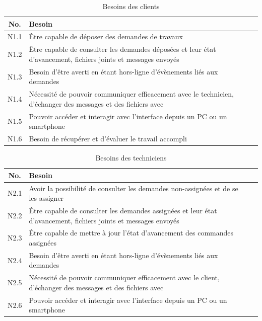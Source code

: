 \documentclass[
    iai, %
    eai, %
]{heig-tb}
\begin{document}
\begin{table}[h]
  \begin{center}
    \caption{Besoins des clients}
    \begin{tabularx}{\textwidth}{cXc}
      No.  & Besoin                                                                                                         \\ \toprule
      N1.1 & Être capable de déposer des demandes de travaux                                                                \\ \midrule
      N1.2 & Être capable de consulter les demandes déposées et leur état d'avancement, fichiers joints et messages envoyés \\ \midrule
      N1.3 & Besoin d'être averti en étant hors-ligne d'évènements liés aux demandes                                        \\ \midrule
      N1.4 & Nécessité de pouvoir communiquer efficacement avec le technicien, d'échanger des messages et des fichiers avec \\ \midrule
      N1.5 & Pouvoir accéder et interagir avec l'interface depuis un PC ou un smartphone                                    \\ \midrule
      N1.6 & Besoin de récupérer et d'évaluer le travail accompli                                                           \\ \midrule
    \end{tabularx}
  \end{center}
\end{table}

\begin{table}[h]
  \begin{center}
    \caption{Besoins des techniciens}
    \begin{tabularx}{\textwidth}{cXc}
      No.  & Besoin                                                                                                          \\ \toprule
      N2.1 & Avoir la possibilité de consulter les demandes non-assignées et de se les assigner                              \\ \midrule
      N2.2 & Être capable de consulter les demandes assignées et leur état d'avancement, fichiers joints et messages envoyés \\ \midrule
      N2.3 & Être capable de mettre à jour l'état d'avancement des commandes assignées                                       \\ \midrule
      N2.4 & Besoin d'être averti en étant hors-ligne d'évènements liés aux demandes                                         \\ \midrule
      N2.5 & Nécessité de pouvoir communiquer efficacement avec le client, d'échanger des messages et des fichiers avec      \\ \midrule
      N2.6 & Pouvoir accéder et interagir avec l'interface depuis un PC ou un smartphone                                     \\ \midrule
    \end{tabularx}
  \end{center}
\end{table}
\end{document}
